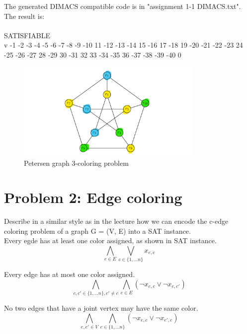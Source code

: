 \documentclass[a4paper,11pt]{article}
\theoremstyle{mytheor}
\begin{document}
The generated DIMACS compatible code is in "assignment 1-1 DIMACS.txt". The result is:\\
\\
SATISFIABLE\\
v -1 -2 -3 -4 -5 -6 -7 -8 -9 -10 11 -12 -13 -14 15 -16 17 -18 19 -20 -21 -22 -23 24 -25 -26 -27 28 -29 30 -31 32 33 -34 -35 36 -37 -38 -39 -40 0\\

\begin{figure}[h]
\caption{Petersen graph 3-coloring problem}
\centering
\includegraphics[width=0.8\textwidth]{assignment1.png}
\end{figure}

\section*{Problem 2: Edge coloring}

Describe in a similar style as in the lecture how we can encode the c-edge coloring problem of a graph G = (V, E) into a SAT instance.\\
Every egde has at least one color assigned, as shown in SAT instance.
\begin{equation}
\bigwedge\limits_{e\in E} \bigvee\limits_{c\in \{1,...n\}} x_{e,c}
\end{equation}

Every edge has at most one color assigned.
\begin{equation}
\bigwedge\limits_{c,c'\in \{1,...n\}, c'\neq c} \bigwedge\limits_{e\in E} (\neg x_{e,c} \vee \neg x_{e,c'})
\end{equation}

No two edges that have a joint vertex may have the same color.
\begin{equation}
\bigwedge\limits_{e,e'\in V} \bigwedge\limits_{c \in \{1,...n\}} (\neg x_{e,c} \vee \neg x_{e',c})
\end{equation}
\end{document}
